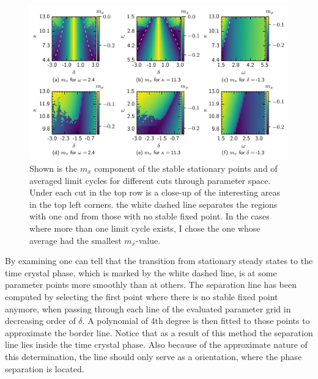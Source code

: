 \begin{figure}[H]
    \hspace*{-1.2cm}
    \includegraphics[scale=1]{pictures/stable_fixp_extended_withline_dashed.png}
    \caption{Shown is the $m_x$ component of the stable stationary points and of averaged limit cycles for different cuts through parameter space. Under each cut in the top row is a close-up of the interesting areas in the top left corners. the white dashed line separates the regions with one and from those with no stable fixed point. In the cases where more than one limit cycle exists, I chose the one whose average had the smallest $m_x$-value.}
    \label{fig:fixedpoint_colormap}
\end{figure}
By examining  one can tell that the transition from stationary steady states to the time crystal phase, which is marked by the white dashed line, is at some parameter points more smoothly than at others. The separation line has been computed by selecting the first point where there is no stable fixed point anymore, when passing through each line of the evaluated parameter grid in decreasing order of $\delta$. A polynomial of 4th degree is then fitted to those points to approximate the border line. Notice that as a result of this method the separation line lies inside the time crystal phase. Also because of the approximate nature of this determination, the line should only serve as a orientation, where the phase separation is located.\\\\
